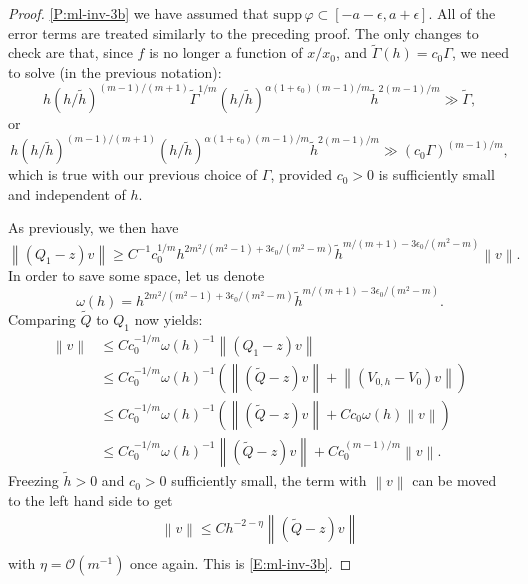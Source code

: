 \documentclass[twoside, final]{amsart}
\theoremstyle{definition}
\numberwithin{equation}{section}
\begin{document}
\begin{proof}
\ref{P:ml-inv-3b} we have assumed that ${\mathrm{supp}\,} {\varphi} \subset
[-a-\epsilon, a + \epsilon]$.  All of the error terms are treated
similarly to the preceding proof.  The only changes to check are that,
since $f$ is no longer a function of $x/x_0$, and ${\widetilde{\Gamma}}(h) = c_0
\Gamma$, we need to solve (in the previous notation):
\[
h (h/{\tilde{h}})^{(m-1)/(m+1)} {\widetilde{\Gamma}}^{1/m} (h/{\tilde{h}})^{ \alpha(1+\epsilon_0 )
  ( m-1)/m } {\tilde{h}}^{2(m-1)/m} \gg {\widetilde{\Gamma}},
\]
or
\[
h (h/{\tilde{h}})^{(m-1)/(m+1)}  (h/{\tilde{h}})^{ \alpha(1+\epsilon_0 ) ( m-1)/m   } {\tilde{h}}^{2(m-1)/m} \gg (c_0\Gamma)^{(m-1)/m},
\]
which is true with our previous choice of $\Gamma$, provided $c_0>0$
is sufficiently small and independent of $h$.  

As previously, we then have
\[
{{\left\lVert{{(Q_1-z)v}}\right\rVert}} {\geqslant} C^{-1} c_0^{1/m} h^{ 2m^2/(m^2-1) +  3 \epsilon_0 /(m^2-m)} {\tilde{h}}^{m/(m+1) - 3
  \epsilon_0 /(m^2-m)}  {{\left\lVert{{v}}\right\rVert}}.
\]
In order to save some space, let us denote
\[
\omega(h) = h^{ 2m^2/(m^2-1) +  3 \epsilon_0 /(m^2-m)} {\tilde{h}}^{m/(m+1) - 3
  \epsilon_0 /(m^2-m)}  .
\]
Comparing ${\widetilde{Q}}$ to $Q_1$ now yields:
\begin{align*}
{{\left\lVert{{v}}\right\rVert}} & {\leqslant} C c_0^{-1/m} \omega(h)^{-1}
    {{\left\lVert{{(Q_1-z)v}}\right\rVert}} \\
& {\leqslant} C c_0^{-1/m} \omega(h)^{-1}\left( {{\left\lVert{{({\widetilde{Q}} -z) v }}\right\rVert}} +
    {{\left\lVert{{(V_{0,h} - V_0 ) v }}\right\rVert}} \right) \\
& {\leqslant} C c_0^{-1/m} \omega(h)^{-1}\left( {{\left\lVert{{({\widetilde{Q}} -z) v }}\right\rVert}} + C c_0 \omega(h)
     {{\left\lVert{{v }}\right\rVert}} \right) \\
& {\leqslant} C c_0^{-1/m} \omega(h)^{-1} {{\left\lVert{{({\widetilde{Q}} -z) v }}\right\rVert}} +
   Cc_0^{(m-1)/m} {{\left\lVert{{v }}\right\rVert}} .
\end{align*}
Freezing ${\tilde{h}}>0$ and $c_0>0$ sufficiently small, 
the term with ${{\left\lVert{{v}}\right\rVert}}$ can be moved to the
left hand side to get
\begin{align*}
{{\left\lVert{{v}}\right\rVert}} {\leqslant} C h^{-2-\eta} {{\left\lVert{{({\widetilde{Q}} -z) v }}\right\rVert}} \\
\end{align*}
with $\eta = {{\mathcal O}}(m^{-1})$ once again.  This is \eqref{E:ml-inv-3b}.

\end{proof}
\end{document}
